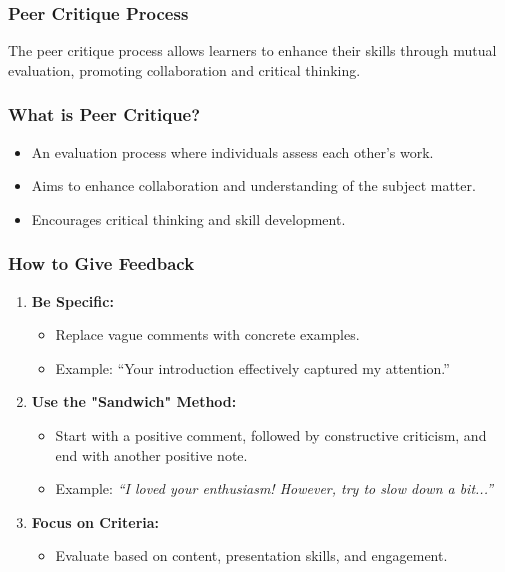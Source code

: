 \documentclass[aspectratio=169]{beamer}
\begin{document}
\begin{frame}[fragile]
  \frametitle{Peer Critique Process}
  The peer critique process allows learners to enhance their skills through mutual evaluation, promoting collaboration and critical thinking.
\end{frame}

\begin{frame}[fragile]
  \frametitle{What is Peer Critique?}
  \begin{itemize}
    \item An evaluation process where individuals assess each other's work.
    \item Aims to enhance collaboration and understanding of the subject matter.
    \item Encourages critical thinking and skill development.
  \end{itemize}
\end{frame}

\begin{frame}[fragile]
  \frametitle{How to Give Feedback}
  \begin{enumerate}
    \item \textbf{Be Specific:} 
      \begin{itemize}
        \item Replace vague comments with concrete examples.
        \item Example: “Your introduction effectively captured my attention.”
      \end{itemize}
    \item \textbf{Use the "Sandwich" Method:} 
      \begin{itemize}
        \item Start with a positive comment, followed by constructive criticism, and end with another positive note.
        \item Example: \textit{“I loved your enthusiasm! However, try to slow down a bit...”}
      \end{itemize}
    \item \textbf{Focus on Criteria:} 
      \begin{itemize}
        \item Evaluate based on content, presentation skills, and engagement.
      \end{itemize}
  \end{enumerate}
\end{frame}
\end{document}
